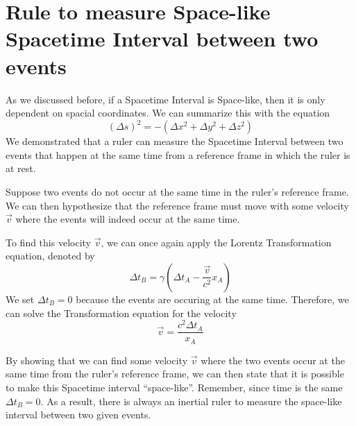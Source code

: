 \documentclass{article}
\begin{document}
\section{Rule to measure Space-like Spacetime Interval between two events}
As we discussed before, if a Spacetime Interval is Space-like, then it is only dependent on spacial coordinates. We can summarize this with the equation
\[
  (\Delta s)^2 = -(\Delta x^2 + \Delta y^2 + \Delta z^2)
\]
We demonstrated that a ruler can measure the Spacetime Interval between two events that happen at the same time from a reference frame in which the ruler is at rest.

Suppose two events do not occur at the same time in the ruler's reference frame. We can then hypothesize that the reference frame must move with some velocity \(\vec{v}\) where the events will indeed occur at the same time.

To find this velocity \(\vec{v}\), we can once again apply the Lorentz Transformation equation, denoted by
\[
  \Delta t_B = \gamma (\Delta t_A - \frac{\vec{v}}{c^2} x_A)
\]
We set \(\Delta t_B = 0\) because the events are occuring at the same time. Therefore, we can solve the Transformation equation for the velocity
\[
  \vec{v} = \frac{c^2 \Delta t_A}{x_A}
\]

By showing that we can find some velocity \(\vec{v}\) where the two events occur at the same time from the ruler's reference frame, we can then state that it is possible to make this Spacetime interval ``space-like''. Remember, since time is the same \(\Delta t_B = 0\). As a result, there is always an inertial ruler to measure the space-like interval between two given events.
\end{document}
